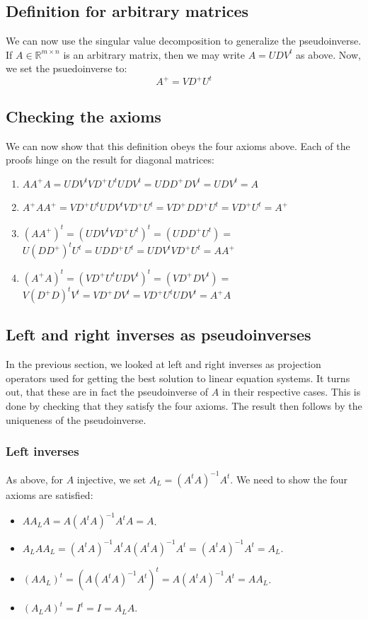 \documentclass[12pt, a4paper]{article}
\numberwithin{equation}{section}
\begin{document}
\subsection{Definition for arbitrary matrices}
We can now use the singular value decomposition to generalize the pseudoinverse. If $A\in\mathbb{R}^{m\times n}$ is an arbitrary matrix, then we may write $A=UD V^t$ as above. Now, we set the psuedoinverse to:
\begin{equation}
A^+=VD^+ U^t
\end{equation}

\subsection{Checking the axioms}
We can now show that this definition obeys the four axioms above. Each of the proofs hinge on the result for diagonal matrices:
\begin{enumerate}
\item $AA^+ A=UDV^t VD^+ U^t UDV^t=UDD^+ DV^t=UDV^t=A$
\item $A^+ AA^+=VD^+ U^t UDV^t VD^+ U^t=VD^+ DD^+ U^t=VD^+ U^t=A^+$
\item $(AA^+)^t=(UDV^t VD^+ U^t)^t=(UDD^+ U^t)=$ \\
$U(DD^+)^t U^t= UDD^+ U^t=UDV^t VD^+ U^t=AA^+$
\item $(A^+A)^t=(VD^+ U^t UDV^t)^t=(VD^+ DV^t)=$ \\
$V(D^+ D)^t V^t=VD^+ DV^t=VD^+ U^t UDV^t=A^+ A$
\end{enumerate}

\subsection{Left and right inverses as pseudoinverses}
In the previous section, we looked at left and right inverses as projection operators used for getting the best solution to linear equation systems. It turns out, that these are in fact the pseudoinverse of $A$ in their respective cases. This is done by checking that they satisfy the four axioms. The result then follows by the uniqueness of the pseudoinverse.

\subsubsection{Left inverses}
As above, for $A$ injective, we set $A_L=(A^t A)^{-1}A^t$. We need to show the four axioms are satisfied:
\begin{itemize}
\item $AA_L A=A(A^t A)^{-1}A^t A=A$.
\item $A_L AA_L=(A^t A)^{-1}A^t A(A^t A)^{-1}A^t=(A^t A)^{-1}A^t=A_L$.
\item $(AA_L)^t=(A(A^t A)^{-1}A^t)^t=A(A^t A)^{-1}A^t=AA_L$.
\item $(A_L A)^t=I^t=I=A_L A$.
\end{itemize}
\end{document}
